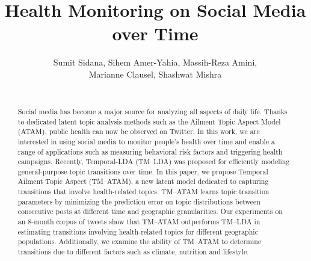 \documentclass{sig-alternate-05-2015}
\newcommand{\tmlda}{\mbox{TM--LDA}\xspace}
\newcommand{\atam}{\mbox{ATAM}\xspace}
\newcommand{\tmatam}{\mbox{TM--ATAM}\xspace}
\newcommand{\titleE}{Health Monitoring on Social Media over Time}
\begin{document}

\title{\titleE}

\author{
\alignauthor Sumit Sidana, Sihem Amer-Yahia, Massih-Reza Amini,\\ Marianne Clausel, Shashwat Mishra
       \\
       \\
}
\maketitle

\begin{abstract}
Social media has become a major source for analyzing all aspects of
daily life. Thanks to dedicated latent topic analysis methods such as
the Ailment Topic Aspect Model (\atam), public health can now be
observed on Twitter. In this work, we are interested in using social
media to monitor people's health over time and enable a range of
applications such as measuring behavioral risk factors and triggering
health campaigns.  Recently, Temporal-LDA (\tmlda) was proposed for
efficiently modeling general-purpose topic transitions over time. In
this paper, we propose Temporal Ailment Topic Aspect (\tmatam), a new
latent model dedicated to capturing transitions that involve
health-related topics. \tmatam learns topic transition parameters by
minimizing the prediction error on topic distributions between
consecutive posts at different time and geographic granularities. Our
experiments on an 8-month corpus of tweets show that \tmatam
outperforms \tmlda in estimating transitions involving health-related
topics for different geographic populations. Additionally, we examine
the ability of \tmatam to determine transitions due to different
factors such as climate, nutrition and lifestyle.
\end{abstract}
\end{document}
